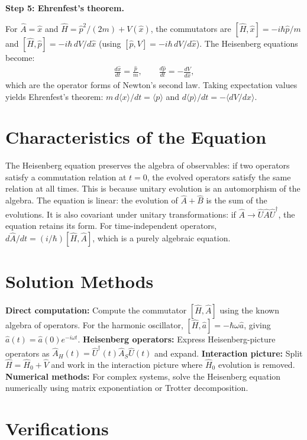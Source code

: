 \textbf{Step 5: Ehrenfest's theorem.}

For $\hat{A} = \hat{x}$ and $\hat{H} = \hat{p}^2/(2m) + V(\hat{x})$, the commutators are $[\hat{H}, \hat{x}] = -i\hbar\hat{p}/m$ and $[\hat{H}, \hat{p}] = -i\hbar\,dV/d\hat{x}$ (using $[\hat{p}, V] = -i\hbar\,dV/d\hat{x}$). The Heisenberg equations become:
\begin{align}
\frac{d\hat{x}}{dt} = \frac{\hat{p}}{m}, \qquad \frac{d\hat{p}}{dt} = -\frac{dV}{d\hat{x}},
\end{align}
which are the operator forms of Newton's second law. Taking expectation values yields Ehrenfest's theorem: $m\,d\langle x\rangle/dt = \langle p\rangle$ and $d\langle p\rangle/dt = -\langle dV/dx\rangle$.

\section*{Characteristics of the Equation}

The Heisenberg equation preserves the algebra of observables: if two operators satisfy a commutation relation at $t = 0$, the evolved operators satisfy the same relation at all times. This is because unitary evolution is an automorphism of the algebra. The equation is linear: the evolution of $\hat{A} + \hat{B}$ is the sum of the evolutions. It is also covariant under unitary transformations: if $\hat{A} \to \hat{U}\hat{A}\hat{U}^\dagger$, the equation retains its form. For time-independent operators, $d\hat{A}/dt = (i/\hbar)[\hat{H}, \hat{A}]$, which is a purely algebraic equation.
\section*{Solution Methods}

\textbf{Direct computation:} Compute the commutator $[\hat{H}, \hat{A}]$ using the known algebra of operators. For the harmonic oscillator, $[\hat{H}, \hat{a}] = -\hbar\omega\hat{a}$, giving $\hat{a}(t) = \hat{a}(0)e^{-i\omega t}$. \textbf{Heisenberg operators:} Express Heisenberg-picture operators as $\hat{A}_H(t) = \hat{U}^\dagger(t)\hat{A}_S\hat{U}(t)$ and expand. \textbf{Interaction picture:} Split $\hat{H} = \hat{H}_0 + \hat{V}$ and work in the interaction picture where $\hat{H}_0$ evolution is removed. \textbf{Numerical methods:} For complex systems, solve the Heisenberg equation numerically using matrix exponentiation or Trotter decomposition.
\section*{Verifications}

